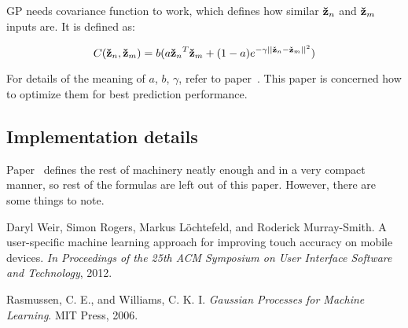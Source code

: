 \documentclass[english,11pt]{article}
\numberwithin{equation}{section}
\begin{document}
GP needs covariance function to work, which defines how similar $\zn$ and $\zm$
inputs are. It is defined as:

$$ C(\zn, \zm) = b(a \zn^T\zm +
(1 - a)e^{-\gamma || \zn - \zm ||^2 } )
$$

For details of the meaning of $a$, $b$, $\gamma$, refer to
paper~\cite{WeiRogMur}. This paper is concerned how to optimize them for best
prediction performance.

\subsection{Implementation details}

Paper~\cite{WeiRogMur} defines the rest of machinery neatly enough and in a very
compact manner, so rest of the formulas are left out of this paper. However,
there are some things to note.

\clearpage

\begin{thebibliography}{9}

        Daryl Weir, Simon Rogers, Markus L\"ochtefeld, and Roderick
        Murray-Smith. A user-specific machine learning approach for improving
        touch accuracy on mobile devices. \emph{In Proceedings of the 25th ACM
        Symposium on User Interface Software and Technology}, 2012.

        Rasmussen, C. E., and Williams, C. K. I. \emph{Gaussian Processes for
        Machine Learning}. MIT Press, 2006.

\end{thebibliography}
\end{document}
